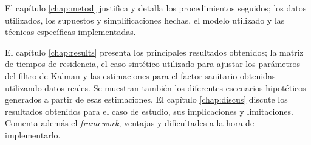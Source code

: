 \begin{intro}
El capítulo \ref{chap:metod} justifica y detalla los procedimientos seguidos; los datos utilizados, los supuestos y simplificaciones hechas, el modelo utilizado y las técnicas específicas implementadas.

El capítulo \ref{chap:results} presenta los principales resultados obtenidos; la matriz de tiempos de residencia, el caso sintético utilizado para ajustar los parámetros del filtro de Kalman y las estimaciones para el factor sanitario obtenidas utilizando datos reales. Se muestran también los diferentes escenarios hipotéticos generados a partir de esas estimaciones. El capítulo \ref{chap:discus} discute los resultados obtenidos para el caso de estudio, sus implicaciones y limitaciones. Comenta además el  \textit{framework}, ventajas y dificultades a la hora de implementarlo.



\end{intro}

%
%




